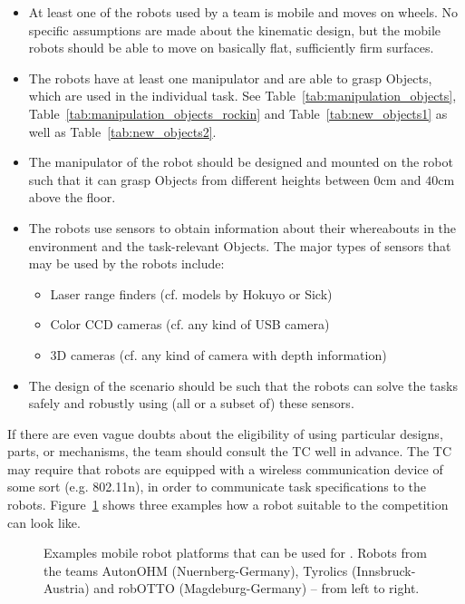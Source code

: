 \begin{itemize}
	\item At least one of the robots used by a team is mobile and moves on wheels. No specific assumptions are made about the kinematic design, but the mobile robots should be able to move on basically flat, sufficiently firm surfaces.
	\item The robots have at least one manipulator and are able to grasp Objects, which are used in the individual task. See Table~\ref{tab:manipulation_objects}, Table~\ref{tab:manipulation_objects_rockin} and Table~\ref{tab:new_objects1} as well as Table~\ref{tab:new_objects2}.
	\item The manipulator of the robot should be designed and mounted on the robot such that it can grasp Objects from different heights between $0\si{\centi\meter}$ and $40\si{\centi\meter}$ above the floor.
	\item The robots use sensors to obtain information about their whereabouts in the environment and the task-relevant Objects. The major types of sensors that may be used by the robots include:
	\begin{itemize}
		\item Laser range finders (cf. models by Hokuyo or Sick)
		\item Color CCD cameras (cf. any kind of USB camera)
		\item 3D cameras (cf. any kind of camera with depth information)
	\end{itemize}
	\item The design of the scenario should be such that the robots can solve the tasks safely and robustly using (all or a subset of) these sensors.
\end{itemize}
If there are even vague doubts about the eligibility of using particular designs, parts, or mechanisms, the team should consult the TC well in advance.
The TC may require that robots are equipped with a wireless communication device of some sort (e.g. 802.11n), in order to communicate task specifications to the robots. Figure~\ref{fig:example_robots} shows three examples how a robot suitable to the competition can look like. 
\begin{figure} [h!]
	\begin{center}
		\subfloat{\missingfigure[figwidth=0.3\textwidth]{}	} \hfill
		 \hfill
		\subfloat{\missingfigure[figwidth=0.3\textwidth]{}	} 
	\end{center}
	\caption{Examples mobile robot platforms that can be used for \RCAW. Robots from the teams AutonOHM (Nuernberg-Germany), Tyrolics (Innsbruck-Austria) and robOTTO (Magdeburg-Germany) -- from left to right. }
	\label{fig:example_robots}
\end{figure}


